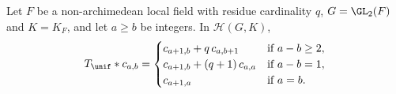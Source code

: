 Let $F$ be a non-archimedean local field with residue cardinality $q$, $G=\GL_2(F)$ and $K=K_F$, and let $a\ge b$ be
integers. In $\mathcal H(G,K)$,
\[
  T_\unif*c_{a,b}=
  \begin{cases}
    c_{a+1,b}+q\,c_{a,b+1}&\text{if }a-b\ge2,\\
    c_{a+1,b}+(q+1)\,c_{a,a}&\text{if }a-b=1,\\
    c_{a+1,a}&\text{if }a=b.
  \end{cases}
\]

